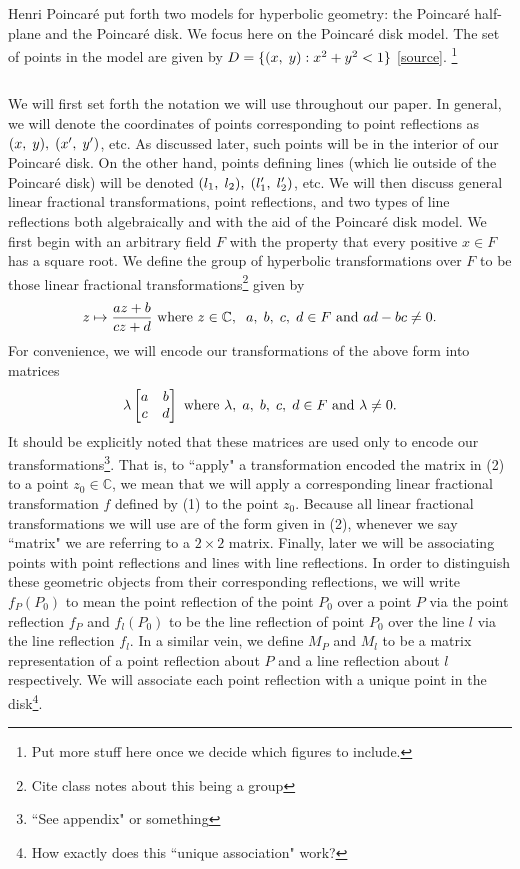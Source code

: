 \documentclass[12pt]{article}
\newcommand{\C}{\mathbb{C}}
\newcommand{\poincare}{Poincar\'{e} }
\newcommand{\ttc}{, \hspace{1mm}}
\newcommand{\lftmat}[4]{\begin{bmatrix} {#1} & {#2} \\ {#3} & {#4} \end{bmatrix}}
\newcommand{\stanlftmat}{\lftmat{a}{b}{c}{d}}
\theoremstyle{plain}
\theoremstyle{definition}
\begin{document}
Henri \poincare put forth two models for hyperbolic geometry: the \poincare half-plane and the \poincare disk. We focus here on the \poincare disk model. The set of points in the model are given by $D = \{(x\ttc y): x^2 + y^2 < 1\}$ \href{http://math2.uncc.edu/~frothe/3181alllhyp1_7.pdf}{[source]}. \footnote{Put more stuff here once we decide which figures to include.} 
	
	





	
\[\]
	
We will first set forth the notation we will use throughout our paper. In general, we will denote the coordinates of points corresponding to point reflections as $(x \ttc y) \ttc (x' \ttc y')$, etc. As discussed later, such points will be in the interior of our \poincare disk. On the other hand, points defining lines (which lie outside of the \poincare disk) will be denoted $(l_1 \ttc l_2) \ttc (l_1' \ttc l_2')$, etc. We will then discuss general linear fractional transformations, point reflections, and two types of line reflections both algebraically and with the aid of the \poincare disk model. We first begin with an arbitrary field $F$ with the property that every positive $x \in F$ has a square root. We define the group of hyperbolic transformations over $F$ to be those linear fractional transformations\footnote{Cite class notes about this being a group} given by
\begin{equation} 
	z \mapsto \frac{az+b}{cz+d} \text{ where } z \in \C, \hspace{2mm} a \ttc b \ttc c \ttc d \in F \text{ and } ad-bc \neq 0. 
\end{equation}
For convenience, we will encode our transformations of the above form into matrices
\begin{equation}
	\lambda \stanlftmat \text{ where } \lambda \ttc a \ttc b \ttc c \ttc d \in F \text{ and } \lambda \neq 0. 
\end{equation}
It should be explicitly noted that these matrices are used only to encode our transformations\footnote{``See appendix" or something}. That is, to ``apply" a transformation encoded the matrix in (2) to a point $z_0 \in \C$, we mean that we will apply a corresponding linear fractional transformation $f$ defined by (1) to the point $z_0$. Because all linear fractional transformations we will use are of the form given in (2), whenever we say ``matrix" we are referring to a $2 \times 2$ matrix. Finally, later we will be associating points with point reflections and lines with line reflections. In order to distinguish these geometric objects from their corresponding reflections, we will write $f_P(P_0)$ to mean the point reflection of the point $P_0$ over a point $P$ via the point reflection $f_P$ and $f_l(P_0)$ to be the line reflection of point $P_0$ over the line $l$ via the line reflection $f_l$. In a similar vein, we define $M_P$ and $M_l$ to be a matrix representation of a point reflection about $P$ and a line reflection about $l$ respectively. We will associate each point reflection with a unique point in the disk\footnote{How exactly does this ``unique association" work? }. 
\end{document}
